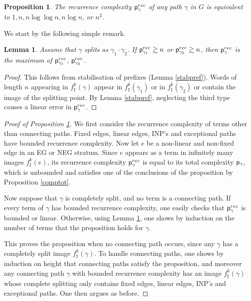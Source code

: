 \documentclass[11pt]{amsart}
\newtheorem{prop}[thm]{Proposition}
\newtheorem{lem}[thm]{Lemma}
\theoremstyle{remark}
\newcommand{\pr}{\cp^{rec}}
\newcommand{\cp}{{\sf  p}}
\begin{document}
\begin{prop} \label{comprec}
 The recurrence complexity $\pr_{\gamma}$ of any path $\gamma$  in $G$ is equivalent to  $1,n,n\log\log n, n\log n$, or $n^2$.
\end{prop}



We start by the following simple remark.

\begin{lem} \label{bete}
Assume that  $\gamma$ splits as $\gamma_1\cdot\gamma_2$. If $\pr_{\gamma_1}\gtrsim n$ or $\pr_{\gamma_2} \gtrsim n$, then $\pr_{\gamma}$ is the maximum of $\pr_{\gamma_1}$, $\pr_{\gamma_2}$. 

\end{lem}

\begin{proof}
 This follows from stabilisation of prefixes (Lemma \ref{stabpref}).  Words of length $n$ appearing in $f^k_\sharp(\gamma)$ appear in $f^k_\sharp(\gamma_1)$ or in $f^k_\sharp(\gamma_2)$ or contain the image of the splitting point. By Lemma \ref{stabpref}, neglecting the third type causes a linear error in $\pr_{\gamma}$.
\end{proof}

\begin{proof}[Proof of Proposition \ref{comprec}]
We first consider the recurrence complexity of terms   other than connecting paths.
  Fixed edges, linear edges, INP's and exceptional paths have bounded recurrence complexity.
Now let $e$ be a   non-linear and non-fixed edge  in an EG or NEG stratum. Since $e$ appears as a term in infinitely many images $f^k_\sharp(e)$, its recurrence complexity $\pr_{\gamma}$ is equal to its total complexity $\cp_\gamma$, which   is unbounded and satisfies one of the conclusions of the proposition by 
Proposition \ref {comptot}.


Now suppose that $\gamma$ is completely split, and no term is a connecting path. If every term of $\gamma$ has bounded recurrence complexity,  
one easily checks that $\pr_\gamma$  is bounded or linear.   Otherwise, using Lemma \ref{bete}, one shows by induction on the number of terms that the proposition holds for $\gamma$.

  This proves the proposition when no connecting path occurs, since any $\gamma$ has a completely split image $f^k_\sharp(\gamma)$.
To handle connecting paths, one shows by induction on height that connecting paths satisfy the proposition, and moreover any connecting path $\gamma$ with bounded recurrence complexity has an image $f^k_\sharp(\gamma)$ whose complete splitting only contains fixed edges, linear edges, INP's and exceptional paths. One then argues as before.
\end{proof}
\end{document}
